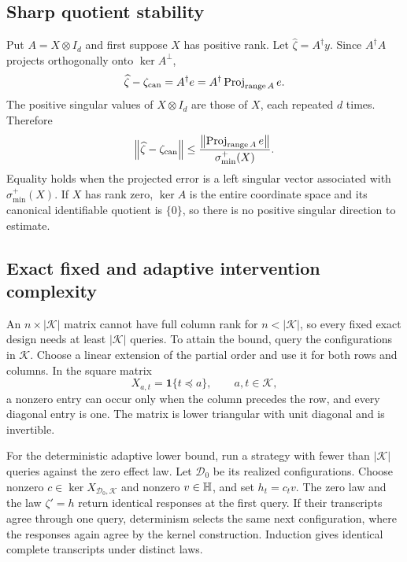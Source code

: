 \subsection{Sharp quotient stability}

Put $A=X\otimes I_d$ and first suppose $X$ has positive rank.  Let
$\widehat\zeta=A^\dagger y$.  Since $A^\dagger A$ projects orthogonally onto
$\ker A^\perp$,
\[
\widehat\zeta-\zeta_{\rm can}
=A^\dagger e
=A^\dagger\operatorname{Proj}_{\operatorname{range}A}e.
\]
The positive singular values of $X\otimes I_d$ are those of $X$, each
repeated $d$ times.  Therefore
\[
\left\lVert \widehat\zeta-\zeta_{\rm can}\right\rVert
\le
\frac{\left\lVert \operatorname{Proj}_{\operatorname{range}A}e\right\rVert}
{\sigma_{\min}^+(X)}.
\]
Equality holds when the projected error is a left singular vector associated
with $\sigma_{\min}^+(X)$.
If $X$ has rank zero, $\ker A$ is the entire coordinate space and its
canonical identifiable quotient is $\{0\}$, so there is no positive singular
direction to estimate.

\subsection{Exact fixed and adaptive intervention complexity}

An $n\times|\mathcal K|$ matrix cannot have full column rank for
$n<|\mathcal K|$, so every fixed exact design needs at least
$|\mathcal K|$ queries.  To attain the bound, query the configurations in
$\mathcal K$.  Choose a linear extension of the partial order and use it for
both rows and columns.  In the square matrix
\[
X_{a,t}=\mathbf1\{t\preceq a\},
\qquad a,t\in\mathcal K,
\]
a nonzero entry can occur only when the column precedes the row, and every
diagonal entry is one.  The matrix is lower triangular with unit diagonal and
is invertible.

For the deterministic adaptive lower bound, run a strategy with fewer than
$|\mathcal K|$ queries against the zero effect law.  Let $\mathcal D_0$ be its
realized configurations.  Choose nonzero
$c\in\ker X_{\mathcal D_0,\mathcal K}$ and nonzero $v\in\mathbb H$, and set
$h_t=c_tv$.  The zero law and the law $\zeta'=h$
return identical responses at the first query.  If their transcripts agree
through one query, determinism selects the same next configuration, where the
responses again agree by the kernel construction.  Induction gives identical
complete transcripts under distinct laws.

